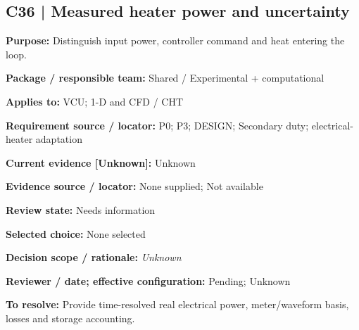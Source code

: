 \documentclass[11pt]{article}
\begin{document}
\par\noindent\begin{minipage}{\textwidth}\small\setlength{\parskip}{2pt}
\subsection*{C36 | Measured heater power and uncertainty}
\textbf{Purpose:} Distinguish input power, controller command and heat entering the loop.\par
\textbf{Package / responsible team:} Shared / Experimental + computational\par
\textbf{Applies to:} VCU; 1-D and CFD / CHT\par
\textbf{Requirement source / locator:} P0; P3; DESIGN; Secondary duty; electrical-heater adaptation\par
\textbf{Current evidence [Unknown]:} Unknown\par
\textbf{Evidence source / locator:} None supplied; Not available\par
\textbf{Review state:} Needs information\par
\textbf{Selected choice:} None selected\par
\textbf{Decision scope / rationale:} \textit{Unknown}\par
\textbf{Reviewer / date; effective configuration:} Pending; Unknown\par
\textbf{To resolve:} Provide time-resolved real electrical power, meter/waveform basis, losses and storage accounting.\par
\end{minipage}\par\vspace{5pt}
\end{document}
